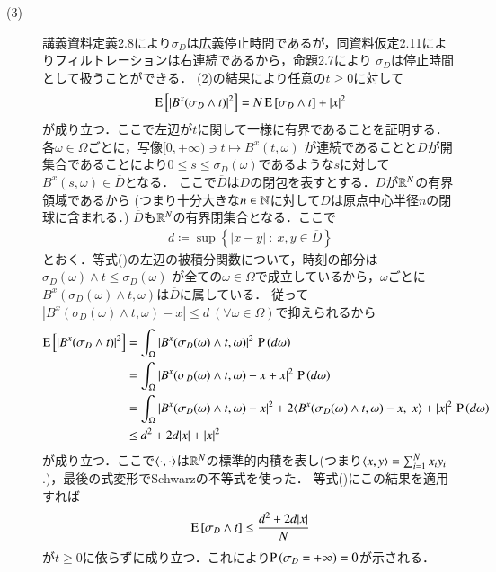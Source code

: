 \begin{prf}
\begin{description}
	\item[(3)] 講義資料定義2.8により$\sigma_D$は広義停止時間であるが，同資料仮定2.11によりフィルトレーションは右連続であるから，命題2.7により
		$\sigma_D$は停止時間として扱うことができる．
		(2)の結果により任意の$t \geq 0$に対して
		\begin{align}
			\operatorname{E} \left[ |B^x(\sigma_D \wedge t)|^2 \right] = N\operatorname{E} \left[ \sigma_D \wedge t \right] + |x|^2 \label{eq:stoc_report_Q2_3}
		\end{align}
		が成り立つ．ここで左辺が$t$に関して一様に有界であることを証明する．各$\omega \in \Omega$ごとに，写像$[0,+\infty) \ni t \longmapsto B^x(t, \omega)$
		が連続であることと$D$が開集合であることにより$0 \leq s \leq \sigma_D(\omega)$であるような$s$に対して$B^x(s, \omega) \in \overline{D}$となる．
		ここで$\overline{D}$は$D$の閉包を表すとする．$D$が$\mathbb{R}^N$の有界領域であるから
		(つまり十分大きな$n \in \mathbb{N}$に対して$D$は原点中心半径$n$の閉球に含まれる．)
		$\overline{D}$も$\mathbb{R}^N$の有界閉集合となる．ここで
		\begin{align}
			d \coloneqq \sup{}{\left\{|x - y|\ :\ x,y \in \overline{D} \right\}}
		\end{align}
		とおく．等式()の左辺の被積分関数について，時刻の部分は$\sigma_D(\omega) \wedge t \leq \sigma_D(\omega)$
		が全ての$\omega \in \Omega$で成立しているから，$\omega$ごとに$B^x(\sigma_D(\omega) \wedge t, \omega)$は$\overline{D}$に属している．
		従って$|B^x(\sigma_D(\omega) \wedge t, \omega) - x| \leq d \ (\forall \omega \in \Omega)$で抑えられるから
		\begin{align}
			\Exp{|B^x(\sigma_D \wedge t)|^2} 
			&= \int_{\Omega} |B^x(\sigma_D(\omega) \wedge t, \omega)|^2\, \prob{d\omega} \\
			&= \int_{\Omega} |B^x(\sigma_D(\omega) \wedge t, \omega) - x + x|^2\, \prob{d\omega} \\
			&= \int_{\Omega} |B^x(\sigma_D(\omega) \wedge t, \omega) - x|^2 + 2\inprod<B^x(\sigma_D(\omega) \wedge t, \omega) - x,\ x> + |x|^2\, \prob{d\omega} \\
			&\leq d^2 + 2d|x| + |x|^2
		\end{align}
		が成り立つ．ここで$\inprod<\cdot, \cdot>$は$\mathbb{R}^N$の標準的内積を表し(つまり$\inprod<x, y> = \sum_{i=1}^{N}x_iy_i$.)，最後の式変形でSchwarzの不等式を使った．
		等式()にこの結果を適用すれば
		\begin{align}
			\operatorname{E} \left[ \sigma_D \wedge t \right] \leq \frac{d^2 + 2d|x|}{N}
		\end{align}
		が$t \geq 0$に依らずに成り立つ．これにより$\operatorname{P} \left(\sigma_D = +\infty\right) = 0$が示される．

\end{description}
\end{prf}
